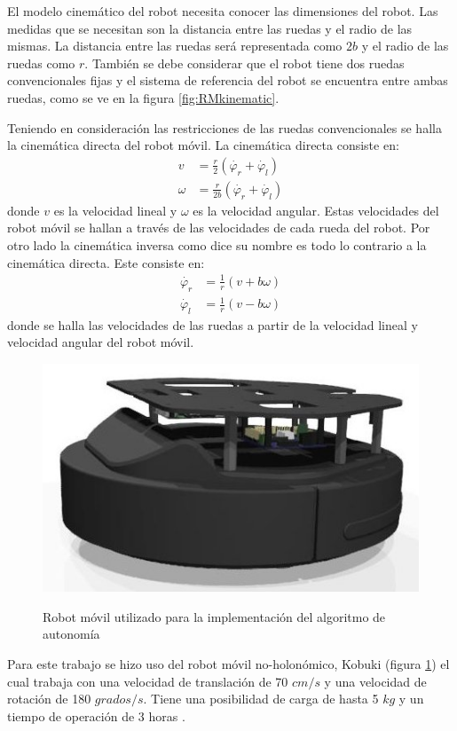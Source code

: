 El modelo cinem\'atico del robot necesita conocer las dimensiones del robot. Las 
medidas que se necesitan son la distancia entre las ruedas y el radio de las 
mismas. La distancia entre las ruedas ser\'a representada como $2b$ y el radio de 
las ruedas como $r$. Tambi\'en se debe considerar que el robot tiene dos ruedas 
convencionales fijas y el sistema de referencia del robot se encuentra entre 
ambas ruedas, como se ve en la figura \ref{fig:RMkinematic}.

Teniendo en consideración las restricciones de las ruedas convencionales se halla la cinemática 
directa del robot móvil. La cinemática directa consiste en:
\begin{align*}
v &= \frac{r}{2}(\dot{\varphi_{r}} + \dot{\varphi_{l}}) \\
\omega &= \frac{r}{2b}(\dot{\varphi_{r}} + \dot{\varphi_{l}})
\end{align*}
donde $v$ es la velocidad lineal y $\omega$ es la velocidad angular. Estas 
velocidades del robot móvil se hallan a 
través de las velocidades de cada rueda del robot. Por otro lado la cinemática inversa 
como dice su nombre es todo lo contrario a la cinemática directa. Este consiste en:
\begin{align*}
\dot{\varphi_{r}} &= \frac{1}{r}(v + b\omega) \\
\dot{\varphi_{l}} &= \frac{1}{r}(v - b\omega)
\end{align*}
donde se halla las velocidades de las ruedas a partir de la velocidad lineal y velocidad
angular del robot móvil.
\begin{figure}%
 \centering \footnotesize
 {\includegraphics[width=0.35\linewidth]{images/turtlebot.jpg}}
 \captionsetup{font=footnotesize}
 \caption{Robot m\'ovil utilizado para la implementación del algoritmo 
 de autonom\'ia}
 \label{fig:kobuki}
 \end{figure}
Para este trabajo se hizo uso del robot m\'ovil no-holon\'omico, Kobuki (figura \ref{fig:kobuki})
el cual trabaja con una velocidad de translaci\'on de 70 $cm/s$ y una velocidad de rotaci\'on 
de 180 $grados/s$. Tiene una posibilidad de carga de hasta 5 $kg$ y un tiempo de operaci\'on 
de 3 horas \cite{aboutKobuki}.
